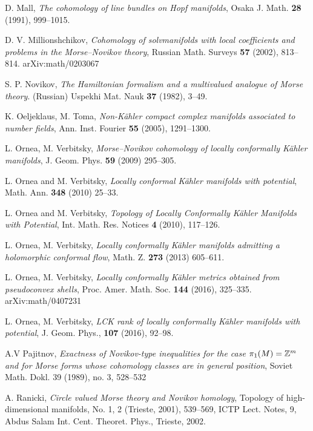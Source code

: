 \documentclass[11pt]{article}
\numberwithin{equation}{section}
\newcommand{\ZZ}{\mathbb{Z}}
\newcommand{\6}{\partial}
\newcounter{problem}[section]
\begin{document}
{\begin{thebibliography}{100}
 D. Mall, {\em The cohomology of line bundles on Hopf manifolds}, Osaka J. Math. {\bf 28} (1991), 999--1015.

D. V. Millionshchikov,
{\em Cohomology of solvmanifolds with local coefficients and
problems in the Morse--Novikov theory}, Russian Math. Surveys {\bf
57} (2002), 813--814. arXiv:math/0203067

S. P. Novikov,
{\em The Hamiltonian formalism and a multivalued analogue of Morse
theory}. (Russian) Uspekhi Mat. Nauk {\bf 37} (1982), 3--49.


  K. Oeljeklaus, M. Toma,
\emph{Non-K\"ahler compact complex manifolds associated to number fields},
Ann. Inst. Fourier {\bf 55} (2005), 1291--1300.



L. Ornea, M. Verbitsky, 
\emph{Morse--Novikov cohomology of locally 
conformally K\"ahler manifolds}, J. Geom. Phys. {\bf 59} (2009) 295--305.

L. Ornea and M. Verbitsky, \emph{Locally
conformal K\"ahler manifolds with potential}, Math. Ann. {\bf 348} (2010) 25--33.

L. Ornea and M. Verbitsky, \emph{Topology of Locally Conformally K\"ahler Manifolds
with Potential}, Int. Math. Res. Notices {\bf 4} (2010), 117--126.

L. Ornea, M. Verbitsky, \emph{Locally conformally K\"ahler manifolds
admitting a holomorphic conformal flow}, Math. Z. {\bf 273} (2013) 605--611.

 L. Ornea, M. Verbitsky, \emph{Locally conformally K\"ahler metrics obtained from pseudoconvex shells},  Proc. Amer. Math. Soc. {\bf 144} (2016), 325--335. 
arXiv:math/0407231

 L. Ornea, M. Verbitsky, \emph{LCK rank of locally conformally K\"ahler manifolds with potential}, J. Geom. Phys., {\bf 107} (2016), 92--98.



A.V Pajitnov,
{\em Exactness of Novikov-type inequalities for the case
 $\pi\sb 1(M)= \ZZ\sp m$ and for Morse forms whose cohomology
 classes are in general position}, Soviet Math. Dokl. 39
(1989), no. 3, 528--532

A. Ranicki, {\em Circle valued Morse theory and Novikov homology},
Topology of high-dimensional manifolds, No. 1, 2 (Trieste, 2001),
539--569, ICTP Lect. Notes, 9, Abdus Salam Int. Cent. Theoret. Phys.,
Trieste,
2002.


\end{thebibliography}}
\end{document}
